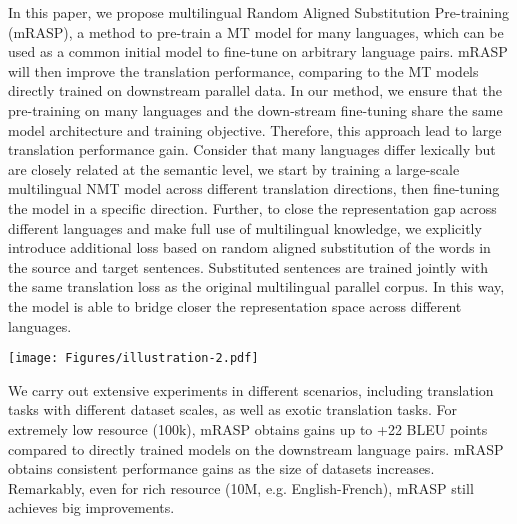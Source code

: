 \documentclass[11pt,a4paper]{article}
\newcommand{\method}{mRASP\xspace}
\begin{document}
In this paper, we propose multilingual Random Aligned Substitution Pre-training (\method), a method to pre-train a MT model for many languages, which can be used as a common initial model to fine-tune on arbitrary language pairs. 
\method will then improve the translation performance, comparing to the  MT models directly trained on downstream parallel data. In our method, we ensure that the pre-training on many languages and the down-stream fine-tuning share the same model architecture and training objective. 
Therefore, this approach lead to large translation performance gain. 
Consider that many languages differ lexically but are closely related at the semantic level, we start by training a large-scale multilingual NMT model across different translation directions, then fine-tuning the model in a specific direction.
Further, to close the representation gap across different languages and make full use of multilingual knowledge, we explicitly introduce additional loss based on random aligned substitution of the words in the source and target sentences. 
Substituted sentences are trained jointly with the same translation loss as the original multilingual parallel corpus.
In this way, the model is able to bridge closer the representation space across different languages.

\begin{figure*}[htbp]
    \centering
    \texttt{[image: Figures/illustration-2.pdf]}
    \caption{The proposed \method method. ``Tok'' denotes token embedding while ``Pos'' denotes position embedding. During the pre-training phase, parallel sentence pairs in many languages are trained using translation loss, together with their substituted ones. We randomly substitute words with the same meanings in the source and target sides. 
    During the fine-tuning phase, we further train the model on the downstream language pairs to obtain specialized MT models.}
    \label{fig:framework}
\end{figure*}

We carry out extensive experiments in different scenarios, including translation tasks with different dataset scales, as well as exotic translation tasks.
 For extremely low resource (100k), \method obtains gains up to +22 BLEU points compared to directly trained models on the downstream language pairs.
 \method obtains consistent performance gains as the size of datasets increases. 
 Remarkably, even for rich resource (10M, e.g. English-French), \method still achieves big improvements. 
\end{document}
